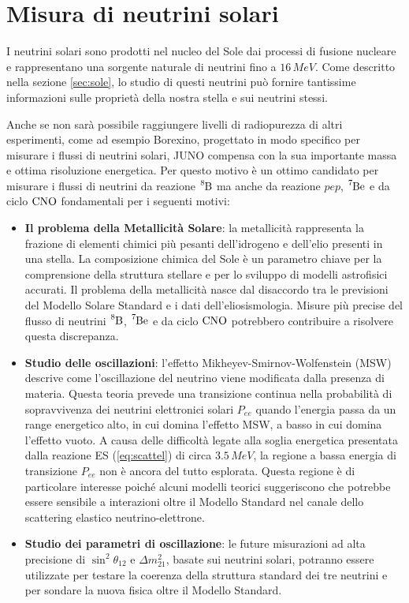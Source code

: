 \section{Misura di neutrini solari}
I neutrini solari sono prodotti nel nucleo del Sole dai processi di fusione nucleare e rappresentano una sorgente naturale di neutrini fino a $16\,\unit{MeV}$. Come descritto nella sezione \ref{sec:sole}, lo studio di questi neutrini può fornire tantissime informazioni sulle proprietà della nostra stella e sui neutrini stessi. 

Anche se non sarà possibile raggiungere livelli di radiopurezza di altri esperimenti, come ad esempio Borexino, progettato in modo specifico per misurare i flussi di neutrini solari, JUNO compensa con la sua importante massa e ottima risoluzione energetica. Per questo motivo è un ottimo candidato per misurare i flussi di neutrini da reazione $\ce{^8B}$ ma anche da reazione $pep$, $\ce{^7Be}$ e da ciclo $\ce{CNO}$ fondamentali per i seguenti motivi:
\begin{itemize}
    \item \textbf{Il problema della Metallicità Solare}: la metallicità rappresenta la frazione di elementi chimici più pesanti dell'idrogeno e dell'elio presenti in una stella. La composizione chimica del Sole è un parametro chiave per la comprensione della struttura stellare e per lo sviluppo di modelli astrofisici accurati. Il problema della metallicità nasce dal disaccordo tra le previsioni del Modello Solare Standard e i dati dell'eliosismologia. Misure più precise del flusso di neutrini $\ce{^8B}$, $\ce{^7Be}$ e da ciclo $\ce{CNO}$ potrebbero contribuire a risolvere questa discrepanza.
    \item \textbf{Studio delle oscillazioni}: l'effetto Mikheyev-Smirnov-Wolfenstein (MSW) descrive come l'oscillazione del neutrino viene modificata dalla presenza di materia. Questa teoria prevede una transizione continua nella probabilità di sopravvivenza dei neutrini elettronici solari $P_{ee}$ quando l'energia passa da un range energetico alto, in cui domina l'effetto MSW, a basso in cui domina l'effetto vuoto. A causa delle difficoltà legate alla soglia energetica presentata dalla reazione ES (\ref{eq:scattel}) di circa $3.5\,\unit{MeV}$, la regione a bassa energia di transizione $P_{ee}$ non è ancora del tutto esplorata. Questa regione è di particolare interesse poiché alcuni modelli teorici suggeriscono che potrebbe essere sensibile a interazioni oltre il Modello Standard nel canale dello scattering elastico neutrino-elettrone.
    \item \textbf{Studio dei parametri di oscillazione}: le future misurazioni ad alta precisione di $\sin^2{\theta_{12}}$ e $\Delta m^2_{21}$, basate sui neutrini solari, potranno essere utilizzate per testare la coerenza della struttura standard dei tre neutrini e per sondare la nuova fisica oltre il Modello Standard.
\end{itemize}

